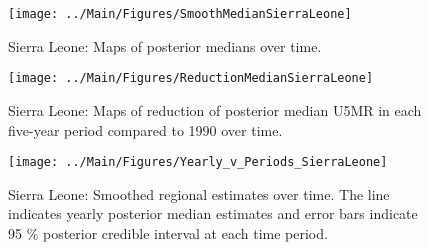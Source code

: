 \documentclass[12pt]{article}\usepackage[]{graphicx}\usepackage[]{color}
\newenvironment{knitrout}{}{} %
\begin{document}
\begin{knitrout}
\color{fgcolor}\begin{figure}[bht]

{\centering \texttt{[image: ../Main/Figures/SmoothMedianSierraLeone]} 

}

\caption[Sierra Leone]{Sierra Leone: Maps of posterior medians over time.}\label{fig:unnamed-chunk-294}
\end{figure}


\end{knitrout}
\begin{knitrout}
\color{fgcolor}\begin{figure}[bht]

{\centering \texttt{[image: ../Main/Figures/ReductionMedianSierraLeone]} 

}

\caption[Sierra Leone]{Sierra Leone: Maps of reduction of posterior median U5MR in each five-year period compared to 1990 over time.}\label{fig:unnamed-chunk-295}
\end{figure}


\end{knitrout}
\begin{knitrout}
\color{fgcolor}\begin{figure}[bht]

{\centering \texttt{[image: ../Main/Figures/Yearly\_v\_Periods\_SierraLeone]} 

}

\caption[Sierra Leone]{Sierra Leone: Smoothed regional estimates over time. The line indicates yearly posterior median estimates and error bars indicate 95 \% posterior credible interval at each time period.}\label{fig:unnamed-chunk-296}
\end{figure}


\end{knitrout}
\end{document}
